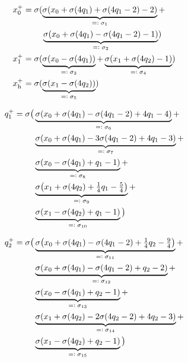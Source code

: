 \documentclass{beamer}
\newcommand{\eqdef}{=\vcentcolon}
\newcommand{\h}{_\text{h}}
\begin{document}
\begin{frame}
	\begin{align*}
		x_0^+			 &=\sigma(\underbrace{\sigma(x_0+\sigma(4q_1)+\sigma(4q_1-2)-2)}_\text{$\eqdef\sigma_1$}+\\
		                 &\qquad\;\underbrace{\sigma(x_0+\sigma(4q_1)-\sigma(4q_1-2)-1)}_\text{$\eqdef\sigma_2$})\\
		x_1^+			 &=\sigma(\underbrace{\sigma(x_0-\sigma(4q_1))}_\text{$\eqdef\sigma_3$}+
		                     \underbrace{\sigma(x_1+\sigma(4q_2)-1)}_\text{$\eqdef\sigma_4$})\\
		x\h^+			 &=\sigma(\underbrace{\sigma(x_1-\sigma(4q_2))}_\text{$\eqdef\sigma_5$})
	\end{align*}
\end{frame}

\begin{frame}
	\begin{align*}
		q_1^+=\sigma\big(&\underbrace{\sigma(x_0+\sigma(4q_1)-\sigma(4q_1-2)+4q_1-4)}_\text{$\eqdef\sigma_6$}+\\
		                 &\underbrace{\sigma(x_0+\sigma(4q_1)-3\sigma(4q_1-2)+4q_1-3)}_\text{$\eqdef\sigma_7$}+\\
		                 &\underbrace{\sigma(x_0-\sigma(4q_1)+q_1-1)}_\text{$\eqdef\sigma_8$}+\\
		                 &\underbrace{\sigma\big(x_1+\sigma(4q_2)+\textstyle{\frac{1}{4}}q_1-\textstyle{\frac{5}{4}}\big)}_\text{$\eqdef\sigma_9$}+\\
		                 &\underbrace{\sigma(x_1-\sigma(4q_2)+q_1-1)}_\text{$\eqdef\sigma_{10}$}\big)
	\end{align*}
\end{frame}

\begin{frame}
	\begin{align*}
		q_2^+=\sigma\big(&\underbrace{\sigma\big(x_0+\sigma(4q_1)-\sigma(4q_1-2)+\textstyle{\frac{1}{4}}q_2-\textstyle{\frac{9}{4}}\big)}_\text{$				 \eqdef\sigma_{11}$}+\\
		                 &\underbrace{\sigma(x_0+\sigma(4q_1)-\sigma(4q_1-2)+q_2-2)}_\text{$\eqdef\sigma_{12}$}+\\
		                 &\underbrace{\sigma(x_0-\sigma(4q_1)+q_2-1)}_\text{$\eqdef\sigma_{13}$}+\\
		                 &\underbrace{\sigma(x_1+\sigma(4q_2)-2\sigma(4q_2-2)+4q_2-3)}_\text{$\eqdef\sigma_{14}$}+\\
		                 &\underbrace{\sigma(x_1-\sigma(4q_2)+q_2-1)}_\text{$\eqdef\sigma_{15}$}\big)
	\end{align*}
\end{frame}
\end{document}
